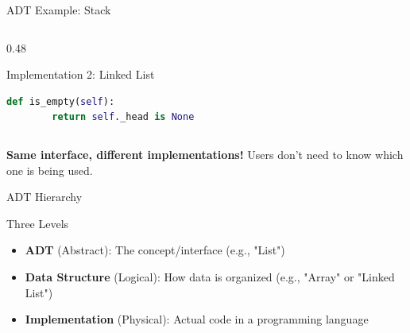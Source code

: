 \documentclass[aspectratio=169,xcolor=dvipsnames]{beamer}
\begin{document}
\begin{frame}[fragile]{ADT Example: Stack}
\begin{columns}
\begin{column}{0.48\textwidth}
\begin{exampleblock}{Implementation 2: Linked List}
\begin{lstlisting}[language=Python,basicstyle=\tiny\ttfamily]
    def is_empty(self):
        return self._head is None
        \end{lstlisting}
      \end{exampleblock}
    \end{column}
  \end{columns}

  \vspace{0.3cm}

  \begin{center}
    \textbf{Same interface, different implementations!} Users don't need to know which one is being used.
  \end{center}
\end{frame}

\begin{frame}{ADT Hierarchy}
  \begin{center}
  \end{center}

  \vspace{0.5cm}

  \begin{block}{Three Levels}
    \begin{itemize}
      \item \textbf{ADT} (Abstract): The concept/interface (e.g., "List")
      \item \textbf{Data Structure} (Logical): How data is organized (e.g., "Array" or "Linked List")
      \item \textbf{Implementation} (Physical): Actual code in a programming language
    \end{itemize}
  \end{block}
\end{frame}
\end{document}
